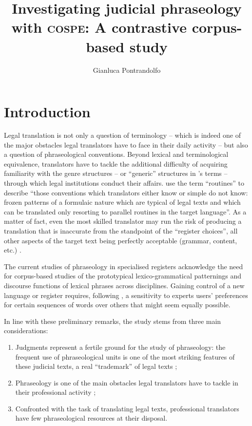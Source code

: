 \documentclass[output=paper]{LSP/langsci}
\author{Gianluca Pontrandolfo}
\title{Investigating judicial phraseology with \textsc{cospe}: A contrastive corpus-based study}
\begin{document}
\section{Introduction}
 Legal translation is not only a question of terminology – which is indeed one of the major obstacles legal translators have to face in their daily activity – but also a question of phraseological conventions. Beyond lexical and terminological equivalence, translators have to tackle the additional difficulty of acquiring familiarity with the genre structures – or “generic” structures in \citeauthor{Hasan1978}'s \citeyear{Hasan1978} terms – through which legal institutions conduct their affairs. \citet[190]{Hatim1990} use the term “routines” to describe “those conventions which translators either know or simple do not know: frozen patterns of a formulaic nature which are typical of legal texts and which can be translated only resorting to parallel routines in the target language”. As a matter of fact, even the most skilled translator may run the risk of producing a translation that is inaccurate from the standpoint of the “register choices”, all other aspects of the target text being perfectly acceptable (grammar, content, etc.) \citep[see][218--219]{Garzone2007}.
 
The current studies of phraseology in specialised registers acknowledge the need for corpus-based studies of the prototypical lexico-grammatical patternings and discourse functions of lexical phrases across disciplines. Gaining control of a new language or register requires, following \citet[5]{Hyland2008}, a sensitivity to experts users’ preferences for certain sequences of words over others that might seem equally possible.
 
In line with these preliminary remarks, the study stems from three main considerations:

\begin{enumerate}
\item Judgments represent a fertile ground for the study of phraseology: the frequent use of phraseological units is one of the most striking features of these judicial texts, a real “trademark” of legal texts \citep[154]{Mortara2001};
\item Phraseology is one of the main obstacles legal translators have to tackle in their professional activity \citep[see][]{Garzone2007,Kjaer2007};
\item Confronted with the task of translating legal texts, professional translators have few phraseological resources at their disposal.
\end{enumerate}
\end{document}
